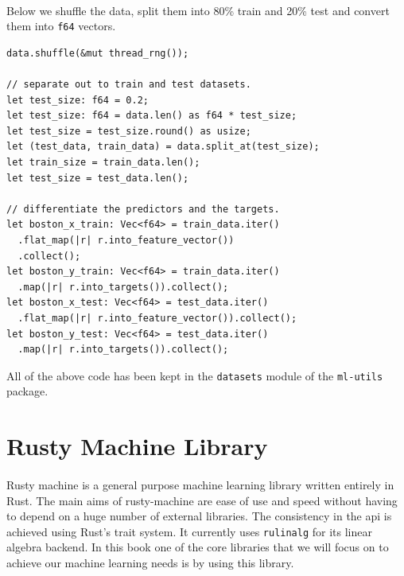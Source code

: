 \documentclass{book}
\begin{document}
\paragraph{}%
Below we shuffle the data, split them into 80\% train and 20\% test and convert them into \lstinline{f64} vectors.
\label{par:}

\begin{lstlisting}[caption={chapter2\\/rustlymachine\_regression\\/src\\/lin\_reg\\.rs}]
data.shuffle(&mut thread_rng());

// separate out to train and test datasets.
let test_size: f64 = 0.2;
let test_size: f64 = data.len() as f64 * test_size;
let test_size = test_size.round() as usize;
let (test_data, train_data) = data.split_at(test_size);
let train_size = train_data.len();
let test_size = test_data.len();

// differentiate the predictors and the targets.
let boston_x_train: Vec<f64> = train_data.iter()
  .flat_map(|r| r.into_feature_vector())
  .collect();
let boston_y_train: Vec<f64> = train_data.iter()
  .map(|r| r.into_targets()).collect();
let boston_x_test: Vec<f64> = test_data.iter()
  .flat_map(|r| r.into_feature_vector()).collect();
let boston_y_test: Vec<f64> = test_data.iter()
  .map(|r| r.into_targets()).collect();
\end{lstlisting}

All of the above code has been kept in the \lstinline{datasets} module of the \lstinline{ml-utils} package.

\label{sub:dataset_specific_code}

\section{Rusty Machine Library}%

\paragraph{}%
Rusty machine is a general purpose machine learning library written entirely in Rust. The main aims of rusty-machine are ease of use and speed without having to depend on a huge number of external libraries. The consistency in the api is achieved using Rust’s trait system. It currently uses \lstinline{rulinalg} for its linear algebra backend. In this book one of the core libraries that we will focus on to achieve our machine learning needs is by using this library.
\label{par:}
\end{document}
